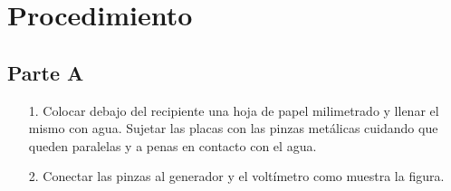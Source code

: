 \documentclass{article}
\begin{document}
\section{Procedimiento}

\subsection{Parte A}
\begin{itemize}
  \item [1.] Colocar debajo del recipiente una hoja de papel milimetrado y llenar el mismo con agua. Sujetar las placas con las pinzas metálicas cuidando que queden paralelas y a penas en contacto con el agua.
  \item [2.] Conectar las pinzas al generador y el voltímetro como muestra la figura.
  
  \phantom{x}


\end{itemize}
\end{document}
